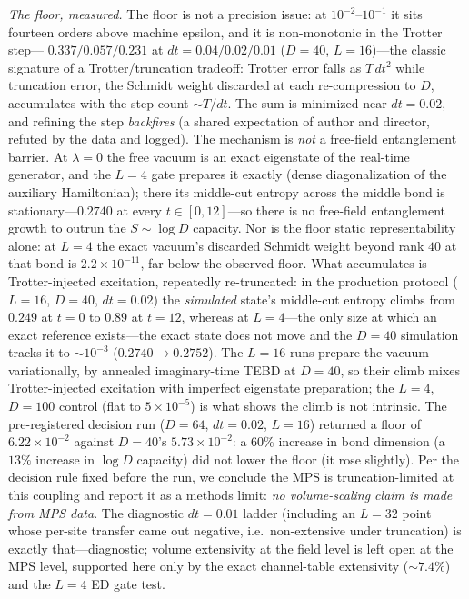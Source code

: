 \documentclass[11pt]{article}
\begin{document}
\emph{The floor, measured.} The floor is not a precision
issue: at $10^{-2}$--$10^{-1}$ it sits fourteen orders above
machine epsilon, and it is non-monotonic in the Trotter step---%
$0.337/0.057/0.231$ at $dt=0.04/0.02/0.01$ ($D=40$,
$L=16$)---the classic signature of a Trotter/truncation tradeoff:
Trotter error falls as $T\,dt^2$ while truncation error, the
Schmidt weight discarded at each re-compression to $D$,
accumulates with the step count ${\sim}T/dt$. The sum is
minimized near $dt=0.02$, and refining the step \emph{backfires}
(a shared expectation of author and director, refuted by the
data and logged). The mechanism is \emph{not} a free-field entanglement
barrier. At $\lambda=0$ the free vacuum is an exact eigenstate of the
real-time generator, and the $L=4$ gate prepares it exactly (dense
diagonalization of the auxiliary Hamiltonian); there its middle-cut
entropy across the middle bond is stationary---$0.2740$ at every
$t\in[0,12]$---so there is no
free-field entanglement
growth to outrun the $S\sim\log D$ capacity. Nor is the floor static
representability alone: at $L=4$ the exact vacuum's discarded Schmidt
weight beyond rank $40$ at that bond is $2.2\times10^{-11}$, far below the observed
floor. What accumulates is Trotter-injected excitation, repeatedly
re-truncated: in the production protocol ($L=16$, $D=40$, $dt=0.02$) the
\emph{simulated} state's middle-cut entropy climbs from $0.249$ at $t=0$
to $0.89$ at $t=12$, whereas at $L=4$---the only size at which an exact
reference exists---the exact state does not move and the $D=40$
simulation tracks it to ${\sim}10^{-3}$ ($0.2740\to0.2752$). The
$L=16$ runs prepare the vacuum variationally, by annealed
imaginary-time TEBD at $D=40$, so their climb mixes Trotter-injected
excitation with imperfect eigenstate preparation; the $L=4$, $D=100$
control (flat to $5\times10^{-5}$) is what shows the climb is not
intrinsic. The pre-registered decision run
($D=64$, $dt=0.02$, $L=16$) returned a floor of
$6.22\times10^{-2}$ against $D=40$'s $5.73\times10^{-2}$: a
$60\%$ increase in bond dimension (a $13\%$ increase in
$\log D$ capacity) did not lower the floor (it rose slightly). Per the decision
rule fixed before the run, we conclude the MPS is
truncation-limited at this coupling and report it as a methods
limit: \emph{no volume-scaling claim is made from MPS data}. The
diagnostic $dt=0.01$ ladder (including an $L=32$ point whose
per-site transfer came out negative, i.e.\ non-extensive under
truncation) is exactly that---diagnostic; volume extensivity at
the field level is left open at the MPS level, supported here
only by the exact channel-table extensivity (${\sim}7.4\%$) and the
$L=4$ ED gate test.
\end{document}
